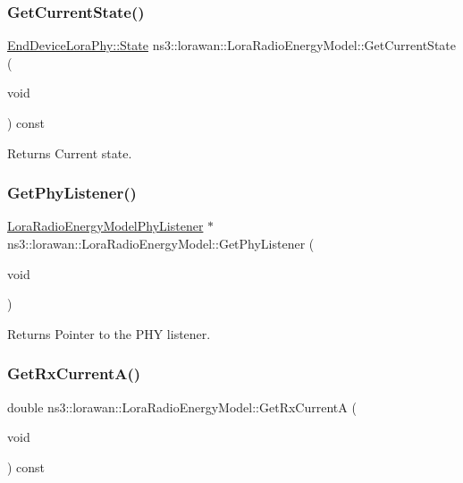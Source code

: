 \subsubsection{\texorpdfstring{Get\+Current\+State()}{GetCurrentState()}}
{\footnotesize\ttfamily \hyperlink{classns3_1_1lorawan_1_1EndDeviceLoraPhy_adc84e4ce7796e19f19f077df9592af15}{End\+Device\+Lora\+Phy\+::\+State} ns3\+::lorawan\+::\+Lora\+Radio\+Energy\+Model\+::\+Get\+Current\+State (\begin{DoxyParamCaption}\item[{void}]{ }\end{DoxyParamCaption}) const}

\begin{DoxyReturn}{Returns}
Current state. 
\end{DoxyReturn}
\mbox{\label{classns3_1_1lorawan_1_1LoraRadioEnergyModel_afed097f1370397dfe2f2e887566806de}} 
\subsubsection{\texorpdfstring{Get\+Phy\+Listener()}{GetPhyListener()}}
{\footnotesize\ttfamily \hyperlink{classns3_1_1lorawan_1_1LoraRadioEnergyModelPhyListener}{Lora\+Radio\+Energy\+Model\+Phy\+Listener} $\ast$ ns3\+::lorawan\+::\+Lora\+Radio\+Energy\+Model\+::\+Get\+Phy\+Listener (\begin{DoxyParamCaption}\item[{void}]{ }\end{DoxyParamCaption})}

\begin{DoxyReturn}{Returns}
Pointer to the P\+HY listener. 
\end{DoxyReturn}
\mbox{\label{classns3_1_1lorawan_1_1LoraRadioEnergyModel_af71e644f848fa5d758fdbe58f8b996d8}} 
\subsubsection{\texorpdfstring{Get\+Rx\+Current\+A()}{GetRxCurrentA()}}
{\footnotesize\ttfamily double ns3\+::lorawan\+::\+Lora\+Radio\+Energy\+Model\+::\+Get\+Rx\+CurrentA (\begin{DoxyParamCaption}\item[{void}]{ }\end{DoxyParamCaption}) const}



